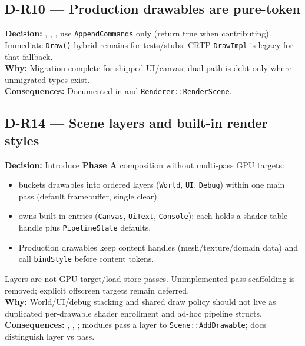 \subsection*{D-R10 --- Production drawables are pure-token}
\begin{decisionbox}[title={D-R10 \quad 2026-07-28}]
\textbf{Decision:} , ,
,  use
\texttt{AppendCommands} only (return true when contributing). Immediate
\texttt{Draw()} hybrid remains for tests/stubs. CRTP \texttt{DrawImpl} is
legacy for that fallback.\\
\textbf{Why:} Migration complete for shipped UI/canvas; dual path is debt only
where unmigrated types exist.\\
\textbf{Consequences:} Documented in  and
\texttt{Renderer::RenderScene}.
\end{decisionbox}

\subsection*{D-R14 --- Scene layers and built-in render styles}
\begin{decisionbox}[title={D-R14 \quad 2026-08-07}]
\textbf{Decision:} Introduce \textbf{Phase A} composition without multi-pass
GPU targets:
\begin{itemize}
  \item {} buckets drawables into ordered layers
        (\texttt{World}, \texttt{UI}, \texttt{Debug}) within one main pass
        (default framebuffer, single clear).
  \item {} owns built-in  entries
        (\texttt{Canvas}, \texttt{UiText}, \texttt{Console}): each holds a
        shader table handle plus \texttt{PipelineState} defaults.
  \item Production drawables keep content handles (mesh/texture/domain data)
        and call \texttt{bindStyle} before content tokens.
\end{itemize}
Layers are not GPU target/load-store passes. Unimplemented pass scaffolding is
removed; explicit offscreen targets remain deferred.\\
\textbf{Why:} World/UI/debug stacking and shared draw policy should not live
as duplicated per-drawable shader enrollment and ad-hoc pipeline structs.\\
\textbf{Consequences:} , ,
; modules pass a layer to
\texttt{Scene::AddDrawable}; docs distinguish layer vs pass.
\end{decisionbox}

